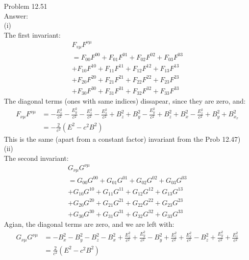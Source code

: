 \documentclass[UTF8]{ctexart}
\begin{document}
	Problem 12.51\\
	Answer:\\
	(i)\\
	The first invariant:\\
	$$\begin{array}{c}
	F_{v \mu} F^{\nu \mu} \\
	=F_{00} F^{00}+F_{01} F^{01}+F_{02} F^{02}+F_{03} F^{03} \\
	+F_{10} F^{10}+F_{11} F^{11}+F_{12} F^{12}+F_{13} F^{13} \\
	+F_{20} F^{20}+F_{21} F^{21}+F_{22} F^{22}+F_{23} F^{23} \\
	+F_{30} F^{30}+F_{31} F^{31}+F_{32} F^{32}+F_{33} F^{33}
	\end{array}$$
	The diagonal terms (ones with same indices) dissapear, since they are zero, and:\\
	$$\begin{aligned}
	F_{\nu \mu} F^{\nu \mu} &=-\frac{E_{x}^{2}}{c^{2}}-\frac{E_{y}^{2}}{c^{2}}-\frac{E_{z}^{2}}{c^{2}}-\frac{E_{x}^{2}}{c^{2}}+B_{z}^{2}+B_{y}^{2}-\frac{E_{y}^{2}}{c^{2}}+B_{z}^{2}+B_{x}^{2}-\frac{E_{z}^{2}}{c^{2}}+B_{y}^{2}+B_{x_{x}}^{2} \\
	&=-\frac{2}{c^{2}}\left(E^{2}-c^{2} B^{2}\right)
	\end{aligned}$$
	This is the same (apart from a constant factor) invariant from the Prob 12.47)\\
	(ii)\\
	The second invariant:\\
	$$\begin{array}{c}
	G_{\nu \mu} G^{\nu \mu} \\
	=G_{00} G^{00}+G_{01} G^{01}+G_{02} G^{02}+G_{03} G^{03} \\
	+G_{10} G^{10}+G_{11} G^{11}+G_{12} G^{12}+G_{13} G^{13} \\
	+G_{20} G^{20}+G_{21} G^{21}+G_{22} G^{22}+G_{23} G^{23} \\
	+G_{30} G^{30}+G_{31} G^{31}+G_{32} G^{32}+G_{33} G^{33}
	\end{array}$$
	Agian, the diagonal terms are zero, and we are left with:\\
	$$\begin{aligned}
		G_{\nu \mu} G^{\nu \mu} &=-B_{x}^{2}-B_{y}^{2}-B_{z}^{2}-B_{x}^{2}+\frac{E_{z}^{2}}{c^{2}}+\frac{E_{y}^{2}}{c^{2}}-B_{y}^{2}+\frac{E_{z}^{2}}{c^{2}}+\frac{E_{x}^{2}}{c^{2}}-B_{z}^{2}+\frac{E_{y}^{2}}{c^{2}}+\frac{E_{x}^{2}}{c^{2}} \\
		&=\frac{2}{c^{2}}\left(E^{2}-c^{2} B^{2}\right)
	\end{aligned}$$
\end{document}
